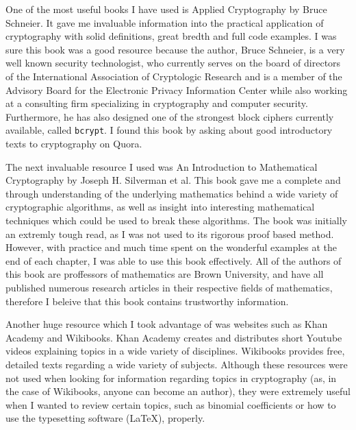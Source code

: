 \documentclass[12pt, a4paper, draft]{report}
\begin{document}
One of the most useful books I have used is Applied Cryptography
by Bruce Schneier\footnotemark. It gave me invaluable information into the
practical application of cryptography with solid definitions,
great bredth and full code examples. I was sure this book was a good
resource because the author, Bruce Schneier, is a very well known
security technologist, who currently serves on the board of directors
of the International Association of Cryptologic Research and is a member
of the Advisory Board for the Electronic Privacy Information Center while
also working at a consulting firm specializing in cryptography and computer
security. Furthermore, he has also designed one of the strongest block
ciphers currently available, called \texttt{bcrypt}. I found this book
by asking about good introductory texts to cryptography on Quora.


The next invaluable resource I used was An Introduction to Mathematical
Cryptography by Joseph H. Silverman et al\footnotemark. This book gave me
a complete and through understanding of the underlying mathematics behind
a wide variety of cryptographic algorithms, as well as insight into
interesting mathematical techniques which could be used to break these
algorithms. The book was initially an extremly tough read, as I was not used
to its rigorous proof based method. However, with practice and much time
spent on the wonderful examples at the end of each chapter, I was able to
use this book effectively. All of the authors of this book are proffessors
of mathematics are Brown University, and have all published numerous
research articles in their respective fields of mathematics, therefore I
beleive that this book contains trustworthy information.



Another huge resource which I took advantage of was websites such as
Khan Academy and Wikibooks. Khan Academy creates and distributes short
Youtube videos explaining topics in a wide variety of disciplines.
Wikibooks provides free, detailed texts regarding a wide variety of
subjects. Although these resources were not used when looking for
information regarding topics in cryptography (as, in the case of Wikibooks,
anyone can become an author), they were extremely useful when I wanted
to review certain topics, such as binomial coefficients or how to use
the typesetting software (\LaTeX), properly.
\end{document}
